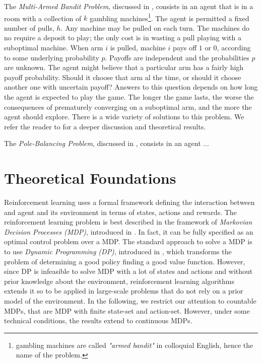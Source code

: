The \textit{Multi-Armed Bandit Problem}, discussed in \cite{Auer2002}, consists in an agent that is in a room with a collection of $k$ gambling machines\footnote{gambling machines are called \textit{"armed bandit"} in colloquial English, hence the name of the problem.}. The agent is permitted a fixed number of pulls, $h$. Any machine may be pulled on each turn. The machines do no require a deposit to play; the only cost is in wasting a pull playing with a suboptimal machine. When arm $i$ is pulled, machine $i$ pays off $1$ or $0$, according to some underlying probability $p$. Payoffs are independent and the probabilities $p$ are unknown.
%
The agent might believe that a particular arm has a fairly high payoff probability. Should it choose that arm al the time, or should it choose another one with uncertain payoff? Answers to this question depends on how long the agent is expected to play the game. The longer the game lasts, the worse the consequences of prematurely converging on a suboptimal arm, and the more the agent should explore.
%
There is a wide variety of solutions to this problem. We refer the reader to \cite{Auer2002} for a deeper discussion and theoretical results.

The \textit{Pole-Balancing Problem}, discussed in \cite{barto1983neuronlike}, consists in an agent ...



\section{Theoretical Foundations}
\label{sec:reinforcement-learning-theoretical foundations}
Reinforcement learning uses a formal framework defining the interaction between and agent and its environment in terms of states, actions and rewards.
The reinforcement learning problem is best described in the framework of \textit{Markovian Decision Processes (MDP)}, introduced in \cite{bellman1957markovian}.
In fact, it can be fully specified as an optimal control problem over a MDP.
The standard approach to solve a MDP is to use \textit{Dynamic Programming (DP)}, introduced in \cite{bertsekas1995dynamic}, which transforms the problem of determining a good policy finding a good value function. 
However, since DP is infeasible to solve MDP with a lot of states and actions and without prior knowledge about the environment, reinforcement learning algorithms extends it so to be applied in large-scale problems that do not rely on a prior model of the environment.
In the following, we restrict our attention to countable MDPs, that are MDP with finite state-set and action-set. 
However, under some technical conditions, the results extend to continuous MDPs.


